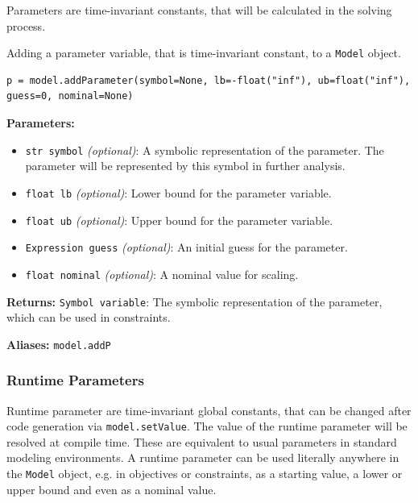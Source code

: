 \documentclass[12pt]{article}
\begin{document}
	Parameters are time-invariant constants, that will be calculated in the solving process.
		
	\begin{mdframed}[backgroundcolor=gray!10, roundcorner=10pt, linewidth=1pt]
		
		Adding a parameter variable, that is time-invariant constant, to a \texttt{Model} object.
		
		\begin{lstlisting}
p = model.addParameter(symbol=None, lb=-float("inf"), ub=float("inf"), guess=0, nominal=None)
		\end{lstlisting}
		\label{addParameter}
		\textbf{Parameters:}
		\begin{itemize}
			\item \texttt{str symbol} \emph{(optional)}: A symbolic representation of the parameter. The parameter will be represented by this symbol in further analysis.
			\item \texttt{float lb} \emph{(optional)}: Lower bound for the parameter variable.
			\item \texttt{float ub} \emph{(optional)}: Upper bound for the parameter variable.
			\item \texttt{Expression guess} \emph{(optional)}: An initial guess for the parameter.
			\item \texttt{float nominal} \emph{(optional)}: A nominal value for scaling.
		\end{itemize}
		
		\textbf{Returns:} 
		\texttt{Symbol variable}: The symbolic representation of the parameter, which can be used in constraints.
		
		\textbf{Aliases:} \texttt{model.addP}
	\end{mdframed}
	
	\subsubsection{Runtime Parameters}
	\label{c:runtimeParameters}
	Runtime parameter are time-invariant global constants, that can be changed after code generation via \texttt{model.setValue}. The value of the runtime parameter will be resolved at compile time. These are equivalent to usual parameters in standard modeling environments. A runtime parameter can be used literally anywhere in the \texttt{Model} object, e.g. in objectives or constraints, as a starting value, a lower or upper bound and even as a nominal value.
	
\end{document}
